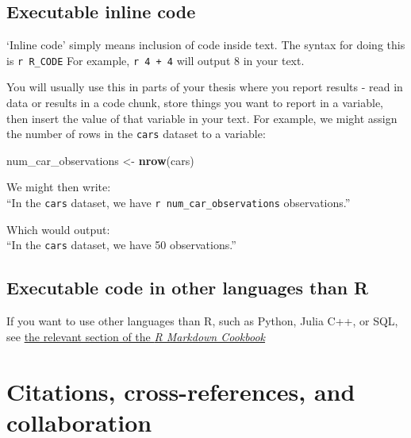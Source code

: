 \documentclass[a4paper, twoside]{templates/ociamthesis}
\newenvironment{Shaded}{\begin{snugshade}}{\end{snugshade}}
\newcommand{\KeywordTok}[1]{\textcolor[rgb]{0.13,0.29,0.53}{\textbf{#1}}}
\newcommand{\NormalTok}[1]{#1}
\newcommand{\StringTok}[1]{\textcolor[rgb]{0.31,0.60,0.02}{#1}}
\renewenvironment{Shaded}
{
  \vspace{10pt}%
  \begin{snugshade}%
}{%
  \end{snugshade}%
  \vspace{8pt}%
}
\theoremstyle{definition}
\theoremstyle{definition}
\theoremstyle{definition}
\theoremstyle{definition}
\theoremstyle{remark}
\begin{document}
\hypertarget{executable-inline-code}{%
\section{Executable inline code}\label{executable-inline-code}}

`Inline code' simply means inclusion of code inside text.
The syntax for doing this is \texttt{\textasciigrave{}r\ R\_CODE\textasciigrave{}}
For example, \texttt{\textasciigrave{}r\ 4\ +\ 4\textasciigrave{}} will output 8 in your text.

You will usually use this in parts of your thesis where you report results - read in data or results in a code chunk, store things you want to report in a variable, then insert the value of that variable in your text.
For example, we might assign the number of rows in the \texttt{cars} dataset to a variable:

\begin{Shaded}
\begin{Highlighting}[]
\NormalTok{num\_car\_observations \textless{}{-}}\StringTok{ }\KeywordTok{nrow}\NormalTok{(cars)}
\end{Highlighting}
\end{Shaded}

We might then write:\\
``In the \texttt{cars} dataset, we have \texttt{\textasciigrave{}r\ num\_car\_observations\textasciigrave{}} observations.''

Which would output:\\
``In the \texttt{cars} dataset, we have 50 observations.''

\hypertarget{executable-code-in-other-languages-than-r}{%
\section{Executable code in other languages than R}\label{executable-code-in-other-languages-than-r}}

If you want to use other languages than R, such as Python, Julia C++, or SQL, see \href{https://bookdown.org/yihui/rmarkdown-cookbook/other-languages.html}{the relevant section of the \emph{R Markdown Cookbook}}

\hypertarget{cites-and-refs}{%
\chapter{Citations, cross-references, and collaboration}\label{cites-and-refs}}
\end{document}
